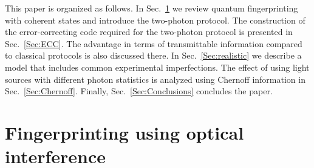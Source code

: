 \documentclass[10pt]{article}
\begin{document}
This paper is organized as follows. In Sec.~\ref{Sec:TwoPhotonProtocol} we review quantum fingerprinting with coherent states and introduce the two-photon protocol. The construction of the error-correcting code required for the two-photon protocol is presented in Sec.~\ref{Sec:ECC}. The advantage in terms of transmittable information compared to classical protocols is also discussed there. In Sec.~\ref{Sec:realistic} we describe a model that includes common experimental imperfections. The effect of using light sources with different photon statistics is analyzed using Chernoff information in Sec.~\ref{Sec:Chernoff}. Finally, Sec.~\ref{Sec:Conclusions} concludes the paper.


\section{Fingerprinting using optical interference}
\label{Sec:TwoPhotonProtocol}
\end{document}
